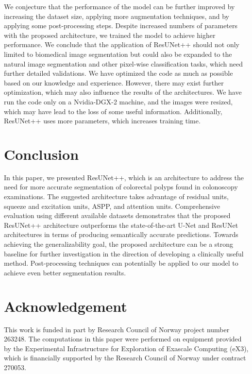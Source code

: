 \documentclass[conference]{IEEEtran}
\newcommand{\resunetplusplus}{ResUNet++\xspace}
\begin{document}
We conjecture that the performance of the model can be further improved by increasing the dataset size, applying more augmentation techniques, and by applying some post-processing steps. Despite increased numbers of parameters with the proposed architecture, we trained the model to achieve higher performance. We conclude that the application of \resunetplusplus should not only limited to biomedical image segmentation but could also be expanded to the natural image segmentation and other pixel-wise classification tasks, which need further detailed validations. We have optimized the code as much as possible based on our knowledge and experience. However, there may exist further optimization, which may also influence the results of the architectures. We have run the code only on a Nvidia-DGX-2 machine, and the images were resized, which may have lead to the loss of some useful information. Additionally, \resunetplusplus uses more parameters, which increases training time.

\section{Conclusion}
\label{section:conclusion}
In this paper, we presented \resunetplusplus, which is an architecture to address the need for more accurate segmentation of colorectal polyps found in colonoscopy examinations. The suggested architecture takes advantage of residual units, squeeze and excitation units, \ac{ASPP}, and attention units. Comprehensive evaluation using different available datasets demonstrates that the proposed \resunetplusplus architecture outperforms the state-of-the-art U-Net and ResUNet architectures in terms of producing semantically accurate predictions. Towards achieving the generalizability goal, the proposed architecture can be a strong baseline for further investigation in the direction of developing a clinically useful method. Post-processing techniques can potentially be applied to our model to achieve even better segmentation results.
\section*{Acknowledgement}
This work is funded in part by Research Council of Norway project number 263248. The computations in this paper were performed on equipment provided by the Experimental Infrastructure for Exploration of Exascale Computing (eX3), which is financially supported by the Research Council of Norway under contract 270053.


 
\end{document}
